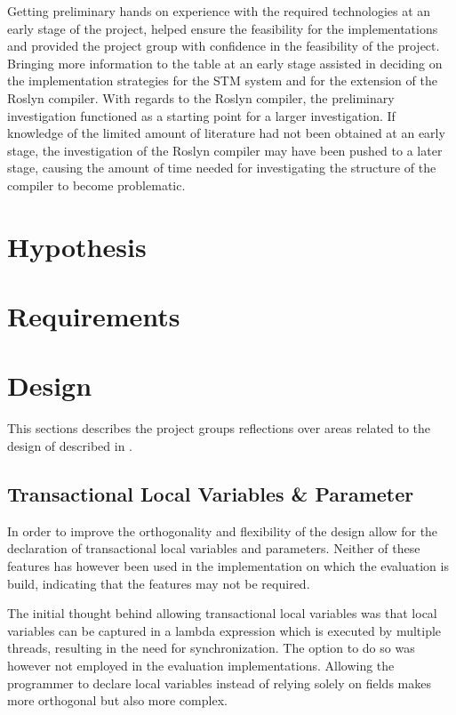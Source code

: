 Getting preliminary hands on experience with the required technologies at an early stage of the project, helped ensure the feasibility for the implementations and provided the project group with confidence in the feasibility of the project. Bringing more information to the table at an early stage assisted in deciding on the implementation strategies for the \ac{STM} system and for the extension of the Roslyn compiler. With regards to the Roslyn compiler, the preliminary investigation functioned as a starting point for a larger investigation. If knowledge of the limited amount of literature had not been obtained at an early stage, the investigation of the Roslyn compiler may have been pushed to a later stage, causing the amount of time needed for investigating the structure of the compiler to become problematic.

\section{Hypothesis}
\section{Requirements}
\section{Design}\label{sec:reflection_design}
This sections describes the project groups reflections over areas related to the design of \stmname described in . 

\subsection{Transactional Local Variables \& Parameter}
In order to improve the orthogonality and flexibility of \stmname the design allow for the declaration of transactional local variables and parameters. Neither of these features has however been used in the implementation on which the evaluation is build, indicating that the features may not be required. 

The initial thought behind allowing transactional local variables was that local variables can be captured in a lambda expression which is executed by multiple threads, resulting in the need for synchronization. The option to do so was however not employed in the evaluation implementations. Allowing the programmer to declare  local variables instead of relying solely on  fields makes \stmnamesp more orthogonal but also more complex.

